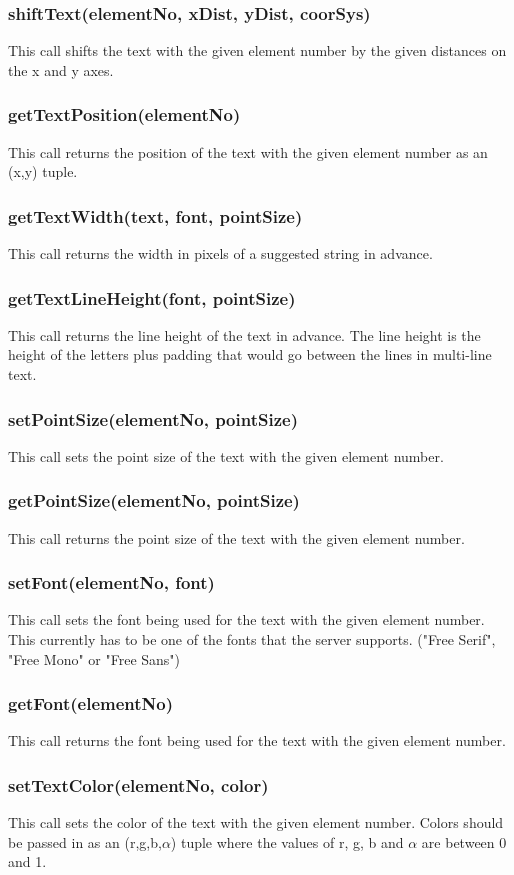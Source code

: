 \documentclass{acm_proc_article-sp}
\begin{document}
\subsubsection{shiftText(elementNo, xDist, yDist, coorSys)}
This call shifts the text with the given element number by the given distances on the x and y axes.
\subsubsection{getTextPosition(elementNo)}
This call returns the position of the text with the given element number as an (x,y) tuple.
\subsubsection{getTextWidth(text, font, pointSize)}
This call returns the width in pixels of a suggested string in advance.
\subsubsection{getTextLineHeight(font, pointSize)}
This call returns the line height of the text in advance. The line height is the height of the letters plus padding that would go between the lines in multi-line text.
\subsubsection{setPointSize(elementNo, pointSize)}
This call sets the point size of the text with the given element number.
\subsubsection{getPointSize(elementNo, pointSize)}
This call returns the point size of the text with the given element number.
\subsubsection{setFont(elementNo, font)}
This call sets the font being used for the text with the given element number. This currently has to be one of the fonts that the server supports. ("Free Serif", "Free Mono" or "Free Sans")
\subsubsection{getFont(elementNo)}
This call returns the font being used for the text with the given element number.
\subsubsection{setTextColor(elementNo, color)}
This call sets the color of the text with the given element number. Colors should be passed in as an (r,g,b,$\alpha$) tuple where the values of r, g, b and $\alpha$ are between 0 and 1.
\end{document}
